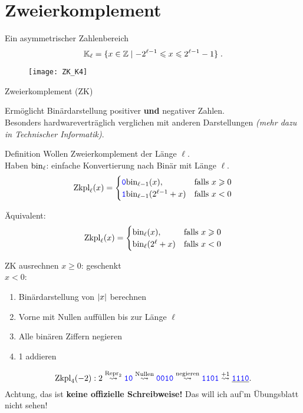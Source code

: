 \section{Zweierkomplement}

\begin{frame}{Ein asymmetrischer Zahlenbereich}
	\[
	\mathbb{K}_{\ell} = \{ x\in \mathbb{Z} \mid -2^{\ell-1} \leqslant x \leqslant 2^{\ell-1} -1 \} \;.
	\]
	
	\begin{figure}
		\centering
		\texttt{[image: ZK\_K4]}
	\end{figure}
	
\end{frame}

\begin{frame}{Zweierkomplement (ZK)}
	
	Ermöglicht Binärdarstellung positiver \textbf{und} negativer Zahlen. \\
	Besonders hardwareverträglich verglichen mit anderen Darstellungen \textit{(mehr dazu in Technischer Informatik)}.

	\begin{block}{Definition}
		Wollen Zweierkomplement der Länge $\ell$. \\ Haben $\text{bin}_\ell$: einfache Konvertierung nach Binär mit Länge $\ell$.
		$$\text{Zkpl}_\ell(x) = \begin{cases} \hbox{\textcolor{blue}{\texttt{0}}} \text{bin}_{\ell-1}(x), & \text{falls } x \geqslant 0 \\ 
										 \hbox{\textcolor{blue}{\texttt{1}}} \text{bin}_{\ell-1}(2^{\ell-1}+x) & \text{falls } x < 0\end{cases}$$
		
		Äquivalent:
		$$\text{Zkpl}_\ell(x) = \begin{cases} \text{bin}_{\ell}(x), & \text{falls } x \geqslant 0 \\ 
										 \text{bin}_{\ell}(2^{\ell}+x) & \text{falls } x < 0\end{cases}$$
	\end{block}
\end{frame}

\begin{frame}{ZK ausrechnen}
	$x \geq 0$: geschenkt \smiley \\
	$x < 0$:
	\begin{enumerate}
		\item Binärdarstellung von $\left\lvert x \right\rvert$ berechnen
		\item Vorne mit Nullen auffüllen bis zur Länge $\ell$
		\item Alle binären Ziffern negieren
		\item 1 addieren
	\end{enumerate}
	
	\begin{Beispiel}
		 $$\fZkpl_4(-2): 2 \stackrel{\fRepr_2}{\?>} \word{10} \stackrel{\text{Nullen}}{\?>} \word{0010} \stackrel{\text{negieren}}{\?>} \word{1101} \stackrel{+1}{\?>} \underline{\word{1110}}. $$
		 Achtung, das ist \textbf{keine offizielle Schreibweise!} Das will ich auf'm Übungsblatt nicht sehen!
	\end{Beispiel}
\end{frame}

